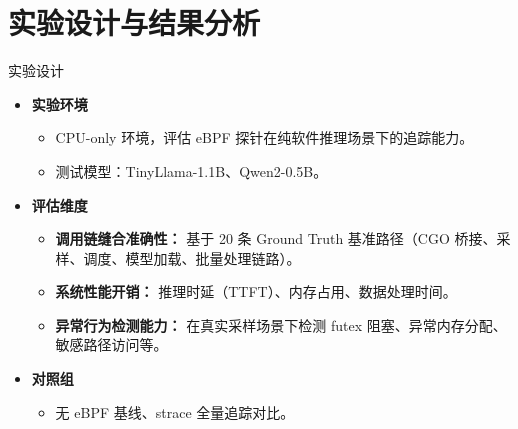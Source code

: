 \documentclass[aspectratio=169, 10pt]{beamer}
\begin{document}
\section{实验设计与结果分析}
\begin{frame}{实验设计}
    \begin{itemize}
        \item \textbf{实验环境}
            \begin{itemize}
                \item CPU-only 环境，评估 eBPF 探针在纯软件推理场景下的追踪能力。
                \item 测试模型：TinyLlama-1.1B、Qwen2-0.5B。
            \end{itemize}

        \item \textbf{评估维度}
            \begin{itemize}
                \item \textbf{调用链缝合准确性：} 基于 20 条 Ground Truth 基准路径（CGO 桥接、采样、调度、模型加载、批量处理链路）。
                \item \textbf{系统性能开销：} 推理时延（TTFT）、内存占用、数据处理时间。
                \item \textbf{异常行为检测能力：} 在真实采样场景下检测 futex 阻塞、异常内存分配、敏感路径访问等。
            \end{itemize}

        \item \textbf{对照组}
            \begin{itemize}
                \item 无 eBPF 基线、strace 全量追踪对比。
            \end{itemize}
    \end{itemize}
\end{frame}
\end{document}

